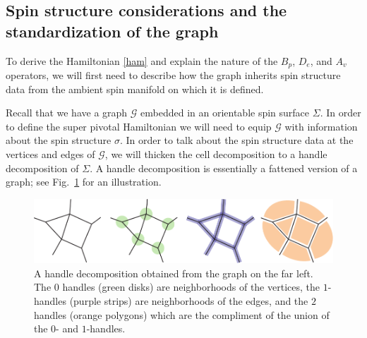 \documentclass[12pt,a4paper]{article}
\newcommand{\mcg}{\mathcal{G}}
\newcommand{\kw}[1]{{\color{kwcolor}\footnotesize{(KW) #1}}}
\newcommand{\dave}[1]{{\color{ao(english)}\footnotesize{(DA) #1}}}
\begin{document}
\subsection{Spin structure considerations and the standardization of the graph} \label{standardized_handles}



To derive the Hamiltonian \eqref{ham} and explain the nature of the $B_p$, $D_e$, and $A_v$ operators, we will first need to describe how the graph inherits spin structure data from the ambient spin manifold on which it is defined. 

Recall that we have a graph $\mcg$ embedded in an orientable spin surface $\Sigma$.
In order to define the super pivotal Hamiltonian we will need to equip $\mcg$ with information about the spin structure $\sigma$. 
In order to talk about the spin structure data at the vertices and edges of $\mcg$, we will thicken the cell decomposition to a handle decomposition of $\Sigma$.
A handle decomposition is essentially a fattened version of a graph; see Fig.~\ref{HandleDecomposition} for an illustration.
\begin{figure}
  \includegraphics{HandleDecomposition.pdf}
  \caption{A handle decomposition obtained from the graph on the far left.
  The $0$ handles (green disks) are neighborhoods of the vertices, the $1$-handles (purple strips) are neighborhoods of the edges, and the $2$ handles (orange polygons) which are the compliment of the union of the $0$- and $1$-handles.}
  \label{HandleDecomposition}
\end{figure}
\end{document}
